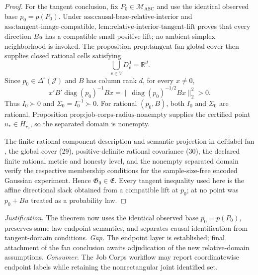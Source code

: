 \documentclass{article}
\begin{document}
\begin{proof}
For the tangent conclusion, fix \(P_0\in\mathcal M_{\mathrm{ASC}}\)
and use the identical observed base \(p_0=p(P_0)\).  Under
\(\text{ass:causal-base-relative-interior}\) and
\(\text{ass:tangent-image-compatible}\),
\(\text{lem:relative-interior-tangent-lift}\) proves that every
direction \(Bu\) has a compatible small positive lift; no ambient
simplex neighborhood is invoked.  The proposition
\(\text{prop:tangent-fan-global-cover}\) then supplies closed rational
cells satisfying
\[
 \bigcup_{v\in V}D_v^0=\mathbb R^d.
\tag{29}
\]
Since \(p_0\in\Delta^\circ(\mathcal J)\) and \(B\) has column rank
\(d\), for every \(x\ne0\),
\[
 x'B'\operatorname{diag}(p_0)^{-1}Bx
 =\|\operatorname{diag}(p_0)^{-1/2}Bx\|_2^2>0.
\tag{30}
\]
Thus \(I_0\succ0\) and \(\Sigma_0=I_0^{-1}\succ0\).  For rational
\((p_0,B)\), both \(I_0\) and \(\Sigma_0\) are rational.  Proposition
\(\text{prop:job-corps-radius-nonempty}\) supplies the certified point
\(u_*\in H_{r_0}\), so the separated domain is nonempty.

The finite rational component description and semantic projection in
\(\text{def:label-fan}\), the global cover (29), positive-definite
rational covariance (30), the declared finite rational metric and
honesty level, and the nonempty separated domain verify the respective
membership conditions for the sample-size-free encoded Gaussian
experiment.  Hence \(\mathfrak G_0\in\mathfrak E\).  Every tangent
inequality used here is the affine directional slack obtained from a
compatible lift at \(p_0\); at no point was \(p_0+Bu\) treated as a
probability law.
\end{proof}
\par\smallskip\noindent \textit{Justification.} The theorem now uses the identical observed base \(p_0=p(P_0)\), preserves same-law endpoint semantics, and separates causal identification from tangent-domain conditions. \textit{Gap.} The endpoint layer is established; final attachment of the fan conclusion awaits adjudication of the new relative-domain assumptions. \textit{Consumer.} The Job Corps workflow may report coordinatewise endpoint labels while retaining the nonrectangular joint identified set.
\end{document}

